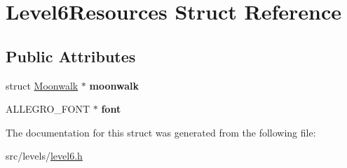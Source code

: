 \hypertarget{structLevel6Resources}{\section{Level6\+Resources Struct Reference}
\label{structLevel6Resources}
}
\subsection*{Public Attributes}
\begin{DoxyCompactItemize}
\item 
\hypertarget{structLevel6Resources_ab11e9072458f8701866695c76c318b35}{struct \hyperlink{structMoonwalk}{Moonwalk} $\ast$ {\bfseries moonwalk}}\label{structLevel6Resources_ab11e9072458f8701866695c76c318b35}

\item 
\hypertarget{structLevel6Resources_a0c1bbff8c1c6bc961a570da113c6c0c3}{A\+L\+L\+E\+G\+R\+O\+\_\+\+F\+O\+N\+T $\ast$ {\bfseries font}}\label{structLevel6Resources_a0c1bbff8c1c6bc961a570da113c6c0c3}

\end{DoxyCompactItemize}


The documentation for this struct was generated from the following file\+:\begin{DoxyCompactItemize}
\item 
src/levels/\hyperlink{level6_8h}{level6.\+h}\end{DoxyCompactItemize}
